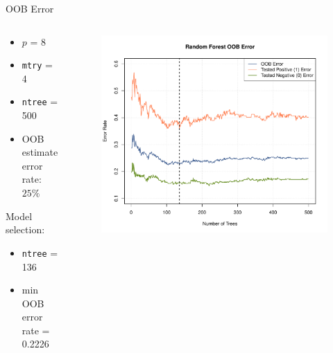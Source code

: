 
\begin{frame}{OOB Error}

\begin{columns}
\begin{column}{0.35\textwidth}
{\footnotesize \begin{itemize}
	\item $p$ = 8
	\item \texttt{mtry} = 4 
	\item \texttt{ntree} = 500
	\item OOB estimate error rate: $25\%$
\end{itemize}}

\vspace{0.5cm}

\; Model selection:
{\footnotesize \begin{itemize}
	\item \texttt{ntree} = 136
	\item min OOB error rate = 0.2226
\end{itemize}}

\end{column}
\begin{column}{0.75\textwidth}
\begin{figure}
\includegraphics[width=1.05\columnwidth]{./Figures/forest/diabete_forest_error4.pdf}
\end{figure}
\end{column}
\end{columns}

\end{frame}

